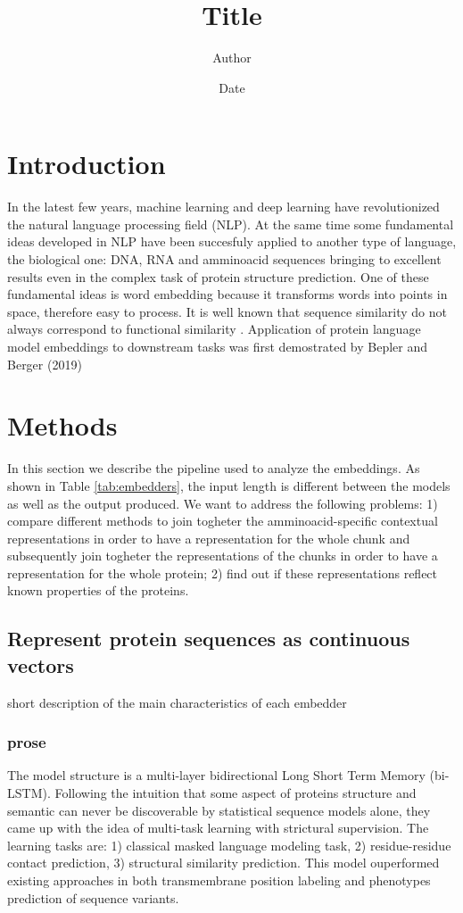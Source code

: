 \documentclass[12pt, letterpaper, twocolumn]{article}
\title{Title}
\author{Author}
\date{Date}
\begin{document}
\maketitle


\section{Introduction}
In the latest few years, machine learning and deep learning have revolutionized the natural language processing field (NLP)\cite{khurana2023natural}. At the same time some fundamental ideas developed in NLP have been succesfuly applied to another type of language, the biological one: DNA, RNA and amminoacid sequences bringing to excellent results even in the complex task of protein structure prediction\cite{jumper2021highly, lin2022language}. One of these fundamental ideas is word embedding \cite{mikolov2013efficient} because it transforms words into points in space, therefore easy to process.
It is well known that sequence similarity do not always correspond to functional similarity \cite{kosloff2008sequence}.
Application of protein language model embeddings to downstream tasks was first demostrated by Bepler and Berger (2019) \cite{bepler2019learning}

\section{Methods}

In this section we describe the pipeline used to analyze the embeddings. As shown in Table \ref{tab:embedders}, the input length is different between the models as well as the output produced. We want to address the following problems: 1) compare different methods to join togheter the amminoacid-specific contextual representations in order to have a representation for the whole chunk and subsequently join togheter the representations of the chunks in order to have a representation for the whole protein; 2) find out if these representations reflect known properties of the proteins.

\subsection{Represent protein sequences as continuous vectors}
short description of the main characteristics of each embedder

\subsubsection{prose \cite{bepler2021learning}}
The model structure is a multi-layer bidirectional Long Short Term Memory (bi-LSTM). Following the intuition that some aspect of proteins structure and semantic can never be discoverable by statistical sequence models alone, they came up with the idea of multi-task learning with strictural supervision. The learning tasks are: 1) classical masked language modeling task, 2) residue-residue contact prediction, 3) structural similarity prediction. This model ouperformed existing approaches in both transmembrane position labeling and phenotypes prediction of sequence variants.
\end{document}
